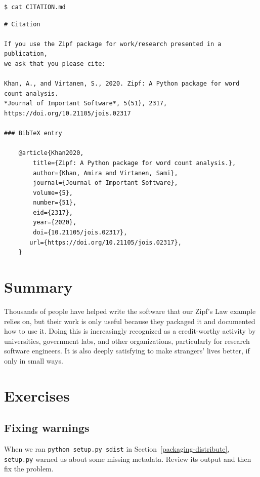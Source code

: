 \documentclass[
]{krantz}
\begin{document}
\begin{verbatim}
$ cat CITATION.md
\end{verbatim}

\begin{verbatim}
# Citation

If you use the Zipf package for work/research presented in a publication,
we ask that you please cite:

Khan, A., and Virtanen, S., 2020. Zipf: A Python package for word count analysis.
*Journal of Important Software*, 5(51), 2317, https://doi.org/10.21105/jois.02317

### BibTeX entry

    @article{Khan2020,
        title={Zipf: A Python package for word count analysis.},
        author={Khan, Amira and Virtanen, Sami},
        journal={Journal of Important Software},
        volume={5},
        number={51},
        eid={2317},
        year={2020},
        doi={10.21105/jois.02317},
       url={https://doi.org/10.21105/jois.02317},
    }
\end{verbatim}

\hypertarget{packaging-summary}{%
\section{Summary}\label{packaging-summary}}

Thousands of people have helped write the software that our Zipf's Law example relies on,
but their work is only useful because they packaged it
and documented how to use it.
Doing this is increasingly recognized as a credit-worthy activity
by universities, government labs, and other organizations,
particularly for research software engineers.
It is also deeply satisfying to make strangers' lives better,
if only in small ways.

\hypertarget{exercises}{%
\section{Exercises}\label{exercises}}

\hypertarget{packaging-ex-fixing-warnings}{%
\subsection{Fixing warnings}\label{packaging-ex-fixing-warnings}}

When we ran \texttt{python\ setup.py\ sdist} in Section~\ref{packaging-distribute},
\texttt{setup.py} warned us about some missing metadata.
Review its output and then fix the problem.
\end{document}
